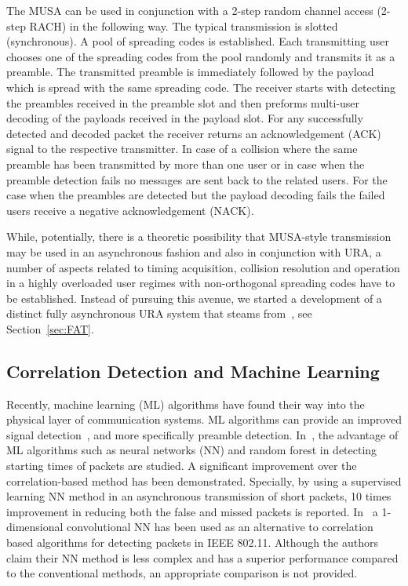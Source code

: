 \documentclass[journal,onecolumn,12pt]{IEEEtran}
\begin{document}
The MUSA can be used in conjunction with a 2-step random channel access (2-step RACH) in the following way. The typical transmission is slotted (synchronous). A pool of spreading codes is established. Each transmitting user chooses one of the spreading codes from the pool randomly and transmits it as a preamble. The transmitted preamble is immediately followed by the payload which is spread with the same spreading code. The receiver starts with detecting the preambles received in the preamble slot and then preforms multi-user decoding of the payloads received in the payload slot. For any successfully detected and decoded packet the receiver returns an  acknowledgement (ACK) signal to the respective transmitter. In case of a collision where the same preamble has been transmitted by more than one user or in case when the preamble detection fails no messages are sent back to the related users. For the case when the preambles are detected but the payload decoding fails the failed users receive a negative acknowledgement (NACK).

While, potentially, there is a theoretic possibility that MUSA-style transmission may be used in an asynchronous fashion and also in conjunction with URA, a number of aspects related to timing acquisition, collision resolution and operation in a highly overloaded user regimes with non-orthogonal spreading codes have to be established. Instead of pursuing this avenue, we started a development of a distinct fully asynchronous URA system that steams from~\cite{TBKN20}, see Section~\ref{sec:FAT}. 
\subsection{Correlation Detection and Machine Learning}
Recently, machine learning (ML) algorithms have found their way into the physical layer of communication systems. ML algorithms can provide an improved signal detection~\cite{OKC17}, and more specifically preamble detection.
In~\cite{RMC20}, the advantage of ML algorithms such as neural networks (NN) and random forest in detecting starting times of packets are studied. A significant improvement over the correlation-based method has been demonstrated. Specially, by using a supervised learning NN method in an asynchronous transmission of short packets, 10 times improvement in reducing both the false and missed packets is reported. In~\cite{NVVD} a 1-dimensional convolutional NN has been used as an alternative to correlation based algorithms for detecting packets in IEEE 802.11. Although the authors claim their NN method is less complex and has a superior performance compared to the conventional methods, an appropriate comparison is not provided.
\end{document}
